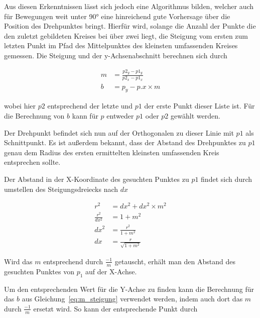 
Aus diesen Erkenntnissen lässt sich jedoch eine Algorithmus bilden, welcher auch für Bewegungen weit unter 90° eine hinreichend gute Vorhersage über die Position des Drehpunktes bringt.
Hierfür wird, solange die Anzahl der Punkte die den zuletzt gebildeten Kreises bei über zwei liegt, die Steigung vom ersten zum letzten Punkt im Pfad des Mittelpunktes des kleinsten umfassenden Kreises gemessen.
Die Steigung und der y-Achsenabschnitt berechnen sich durch

\begin{equation}
    \begin{split}
        m &= \frac{p2_y - p1_y}{p2_x - p1_x} \\
        b &= p_y - p.x \times m
    \end{split}
    \label{eq:m_steigung}
\end{equation}

wobei hier $p2$ entsprechend der letzte und $p1$ der erste Punkt dieser Liste ist.
Für die Berechnung von $b$ kann für $p$ entweder $p1$ oder $p2$ gewählt werden.

Der Drehpunkt befindet sich nun auf der Orthogonalen zu dieser Linie mit $p1$ als Schnittpunkt.
Es ist außerdem bekannt, dass der Abstand des Drehpunktes zu $p1$ genau dem Radius des ersten ermittelten kleinsten umfassenden Kreis entsprechen sollte.

Der Abstand in der X-Koordinate des gesuchten Punktes zu $p1$ findet sich durch umstellen des Steigungsdreiecks nach $dx$

\begin{equation}
    \begin{split}
        r^2 &= dx^2 + dx^2 \times m^2 \\
        \frac{r^2}{dx^2} &= 1 + m^2 \\
        dx^2 &= \frac{r^2}{1+m^2} \\
        dx &= \frac{r}{\sqrt{1 + m^2}}
    \end{split}
    \label{eq:steigungsdreieck}
\end{equation}

Wird das $m$ entsprechend durch $\frac{-1}{m}$ getauscht, erhält man den Abstand des gesuchten Punktes von $p_1$ auf der X-Achse.

Um den entsprechenden Wert für die Y-Achse zu finden kann die Berechnung für das $b$ aus Gleichung~\ref{eq:m_steigung} verwendet werden, indem auch dort das $m$ durch $\frac{-1}{m}$ ersetzt wird.
So kann der entsprechende Punkt durch

